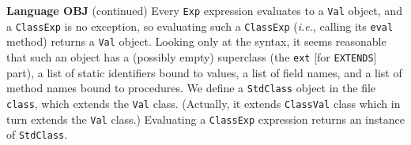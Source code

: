 \begin{minipage}[t]{\sw}
\slidenumber
\LARGE
{\bf Language OBJ} (continued)\exx
Every \verb'Exp' expression evaluates to a \verb'Val' object,
and a \verb'ClassExp' is no exception,
so evaluating such a \verb'ClassExp'
({\em i.e.}, calling its \verb'eval' method)
returns a \verb'Val' object.
Looking only at the syntax,
it seems reasonable
that such an object has a (possibly empty) superclass
(the \verb'ext' [for \verb'EXTENDS'] part),
a list of static identifiers bound to values,
a list of field names,
and a list of method names bound to procedures.\exx
We define a \verb'StdClass' object in the file \verb'class',
which extends the \verb'Val' class.
(Actually, it extends \verb'ClassVal' class
which in turn extends the \verb'Val' class.)
Evaluating a \verb'ClassExp' expression
returns an instance of \verb'StdClass'.
\end{minipage}

